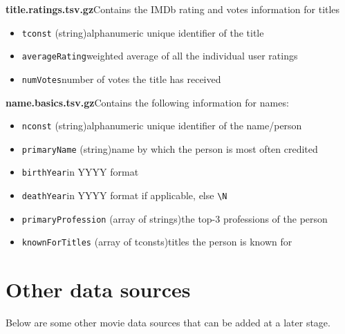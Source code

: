 \documentclass[11pt]{article}
\begin{document}
    \textbf{title.ratings.tsv.gz}\textemdash Contains the IMDb rating and votes information for titles

    \begin{itemize}
        \item \texttt{tconst} (string)\textemdash alphanumeric unique identifier of the title
        \item \texttt{averageRating}\textemdash weighted average of all the individual user ratings
        \item \texttt{numVotes}\textemdash number of votes the title has received
    \end{itemize}

    \textbf{name.basics.tsv.gz}\textemdash Contains the following information for names:

    \begin{itemize}
        \item \texttt{nconst} (string)\textemdash alphanumeric unique identifier of the name/person
        \item \texttt{primaryName} (string)\textemdash name by which the person is most often credited
        \item \texttt{birthYear}\textemdash in YYYY format
        \item \texttt{deathYear}\textemdash in YYYY format if applicable, else \texttt{\textbackslash N}
        \item \texttt{primaryProfession} (array of strings)\textemdash the top-3 professions of the person
        \item \texttt{knownForTitles} (array of tconsts)\textemdash titles the person is known for
    \end{itemize}

    \section{Other data sources} \label{sec:other_data}

    Below are some other movie data sources that can be added at a later stage.
\end{document}
